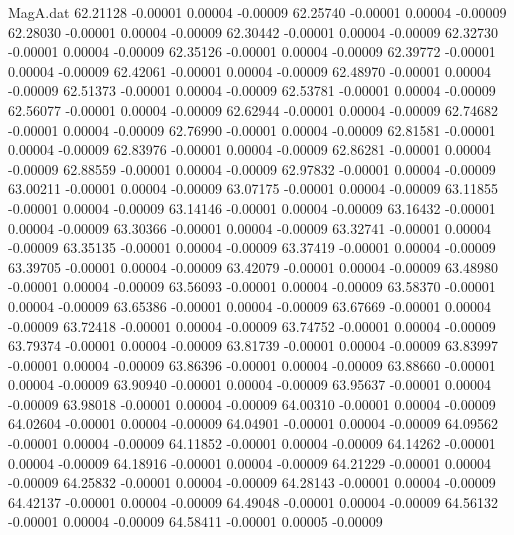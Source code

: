 \begin{filecontents}{MagA.dat}
  62.21128   -0.00001    0.00004   -0.00009
  62.25740   -0.00001    0.00004   -0.00009
  62.28030   -0.00001    0.00004   -0.00009
  62.30442   -0.00001    0.00004   -0.00009
  62.32730   -0.00001    0.00004   -0.00009
  62.35126   -0.00001    0.00004   -0.00009
  62.39772   -0.00001    0.00004   -0.00009
  62.42061   -0.00001    0.00004   -0.00009
  62.48970   -0.00001    0.00004   -0.00009
  62.51373   -0.00001    0.00004   -0.00009
  62.53781   -0.00001    0.00004   -0.00009
  62.56077   -0.00001    0.00004   -0.00009
  62.62944   -0.00001    0.00004   -0.00009
  62.74682   -0.00001    0.00004   -0.00009
  62.76990   -0.00001    0.00004   -0.00009
  62.81581   -0.00001    0.00004   -0.00009
  62.83976   -0.00001    0.00004   -0.00009
  62.86281   -0.00001    0.00004   -0.00009
  62.88559   -0.00001    0.00004   -0.00009
  62.97832   -0.00001    0.00004   -0.00009
  63.00211   -0.00001    0.00004   -0.00009
  63.07175   -0.00001    0.00004   -0.00009
  63.11855   -0.00001    0.00004   -0.00009
  63.14146   -0.00001    0.00004   -0.00009
  63.16432   -0.00001    0.00004   -0.00009
  63.30366   -0.00001    0.00004   -0.00009
  63.32741   -0.00001    0.00004   -0.00009
  63.35135   -0.00001    0.00004   -0.00009
  63.37419   -0.00001    0.00004   -0.00009
  63.39705   -0.00001    0.00004   -0.00009
  63.42079   -0.00001    0.00004   -0.00009
  63.48980   -0.00001    0.00004   -0.00009
  63.56093   -0.00001    0.00004   -0.00009
  63.58370   -0.00001    0.00004   -0.00009
  63.65386   -0.00001    0.00004   -0.00009
  63.67669   -0.00001    0.00004   -0.00009
  63.72418   -0.00001    0.00004   -0.00009
  63.74752   -0.00001    0.00004   -0.00009
  63.79374   -0.00001    0.00004   -0.00009
  63.81739   -0.00001    0.00004   -0.00009
  63.83997   -0.00001    0.00004   -0.00009
  63.86396   -0.00001    0.00004   -0.00009
  63.88660   -0.00001    0.00004   -0.00009
  63.90940   -0.00001    0.00004   -0.00009
  63.95637   -0.00001    0.00004   -0.00009
  63.98018   -0.00001    0.00004   -0.00009
  64.00310   -0.00001    0.00004   -0.00009
  64.02604   -0.00001    0.00004   -0.00009
  64.04901   -0.00001    0.00004   -0.00009
  64.09562   -0.00001    0.00004   -0.00009
  64.11852   -0.00001    0.00004   -0.00009
  64.14262   -0.00001    0.00004   -0.00009
  64.18916   -0.00001    0.00004   -0.00009
  64.21229   -0.00001    0.00004   -0.00009
  64.25832   -0.00001    0.00004   -0.00009
  64.28143   -0.00001    0.00004   -0.00009
  64.42137   -0.00001    0.00004   -0.00009
  64.49048   -0.00001    0.00004   -0.00009
  64.56132   -0.00001    0.00004   -0.00009
  64.58411   -0.00001    0.00005   -0.00009

\end{filecontents}
